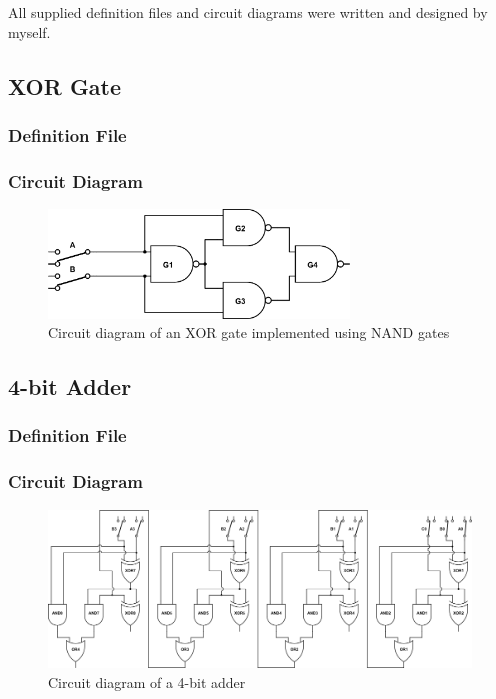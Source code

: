 \documentclass[a4paper,10pt]{article}
\begin{document}
All supplied definition files and circuit diagrams were written and designed by myself.

\subsection{XOR Gate}
\subsubsection{Definition File}

\subsubsection{Circuit Diagram}
\begin{figure}[h]
 \centering
 \includegraphics[width=8cm]{../../examples/xor.png}
 \caption{Circuit diagram of an XOR gate implemented using NAND gates}
 \label{fig:example-xor}
\end{figure}

\subsection{4-bit Adder}
\subsubsection{Definition File}

\subsubsection{Circuit Diagram}
\begin{figure}[h]
 \centering
 \includegraphics[width=16cm]{../../examples/4-bit-adder.png}
 \caption{Circuit diagram of a 4-bit adder}
 \label{fig:example-adder}
\end{figure}
\end{document}
